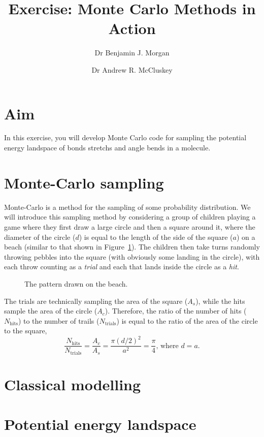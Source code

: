 \documentclass[a4paper]{article}
\title{Exercise: Monte Carlo Methods in Action}
\author[1]{Dr Benjamin J. Morgan}
\author[1,2]{Dr Andrew R. McCluskey}
\affil[1]{Department of Chemistry, University of Bath, email: b.j.morgan@bath.ac.uk}
\affil[2]{Diamond Light Source, email: andrew.mccluskey@diamond.ac.uk}
\begin{document}
\maketitle

\section*{Aim}

In this exercise, you will develop Monte Carlo code for sampling the potential energy landspace of bonds stretchs and angle bends in a  molecule.

\section{Monte-Carlo sampling}

Monte-Carlo is a method for the sampling of some probability distribution.
We will introduce this sampling method by considering a group of children playing a game where they first draw a large circle and then a square around it, where the diameter of the circle ($d$) is equal to the length of the side of the square ($a$) on a beach (similar to that shown in Figure~\ref{fig:cir}).
The children then take turns randomly throwing pebbles into the square (with obviously some landing in the circle), with each throw counting as a \emph{trial} and each that lands inside the circle as a \emph{hit}.
%
\begin{figure}[t]
\centering
\label{fig:cir}
\caption{The pattern drawn on the beach.}
\end{figure}
%

The trials are technically sampling the area of the square ($A_s$), while the hits sample the area of the circle ($A_c$).
Therefore, the ratio of the number of hits ($N_{\text{hits}}$) to the number of trails ($N_{\text{trials}}$) is equal to the ratio of the area of the circle to the square,
%
\begin{equation}
  \frac{N_{\text{hits}}}{N_{\text{trials}}} = \frac{A_c}{A_s} = \frac{\pi(d/2)^2}{a^2} = \frac{\pi}{4}\text{, where }d=a.
\end{equation}

\section{Classical modelling}

\section{Potential energy landspace}




\end{document}
